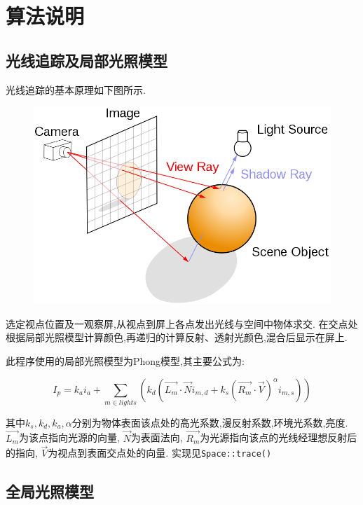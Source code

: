 \section{算法说明}
\subsection{光线追踪及局部光照模型}
光线追踪的基本原理如下图所示.
\begin{figure}[H]
  \centering
  \includegraphics[scale=0.4]{res/ray_tracing.png}
\end{figure}

选定视点位置及一观察屏,从视点到屏上各点发出光线与空间中物体求交.
在交点处根据局部光照模型计算颜色,再递归的计算反射、透射光颜色,混合后显示在屏上.

此程序使用的局部光照模型为Phong模型,其主要公式为\cite{phong}:

\[  I_p = k_ai_a + \sum_{m\in lights} (k_d ( \overrightarrow{L_m} \cdot \overrightarrow{N} i_{m, d} + k_s(\overrightarrow{R_m}\cdot
  \overrightarrow{V})^{\alpha} i_{m, s}))  \]

其中$ k_s, k_d, k_a, \alpha$分别为物体表面该点处的高光系数,漫反射系数,环境光系数,亮度.
$ \overrightarrow{L_m}$为该点指向光源的向量, $ \overrightarrow{N}$为表面法向,
$ \overrightarrow{R_m}$为光源指向该点的光线经理想反射后的指向,
$ \overrightarrow{V}$为视点到表面交点处的向量. 实现见\verb|Space::trace()|

\subsection{全局光照模型}

